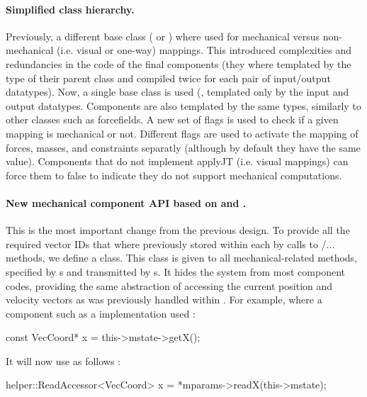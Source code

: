 \paragraph{Simplified  class hierarchy.}
Previously, a different base class ( or ) where used for mechanical versus non-mechanical (i.e. visual or one-way) mappings.
This introduced complexities and redundancies in the code of the final components (they where templated by the type of their parent class and compiled twice for each pair of input/output datatypes).
Now, a single base class is used (, templated only by the input and output datatypes.
Components are also templated by the same types, similarly to other classes such as forcefields.
A new set of flags is used to check if a given mapping is mechanical or not.
Different flags are used to activate the mapping of forces, masses, and constraints separatly (although by default they have the same value).
Components that do not implement applyJT (i.e. visual mappings) can force them to false to indicate they do not support mechanical computations.

\paragraph{New mechanical component API based on  and .}
This is the most important change from the previous design.
To provide all the required vector IDs that where previously stored within each  by calls to /... methods, we define a  class.
This class is given to all mechanical-related methods, specified by s and transmitted by s.
It hides the  system from most component codes, providing the same abstraction of accessing the current position and velocity vectors as was previously handled within . For example, where a component such as a  implementation used :
\begin{code_cpp}
const VecCoord* x = this->mstate->getX();
\end{code_cpp}
It will now use  as follows :
\begin{code_cpp}
helper::ReadAccessor<VecCoord> x = *mparams->readX(this->mstate);
\end{code_cpp}

